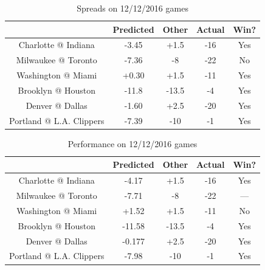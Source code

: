 \documentclass{article}
\begin{document}
\begin{table}
  \begin{center}
    \begin{tabular}{ | c | c | c | c | c | }
      \hline
                                & Predicted     & Other  & Actual & Win?  \\ \hline
      Charlotte @ Indiana       & -3.45         & +1.5   & -16    & Yes   \\ \hline
      Milwaukee @ Toronto       & -7.36         & -8     & -22    & No   \\ \hline
      Washington @ Miami        & +0.30         & +1.5   & -11    & Yes    \\ \hline
      Brooklyn @ Houston        & -11.8         & -13.5  & -4     & Yes   \\ \hline
      Denver @ Dallas           & -1.60         & +2.5   & -20    & Yes   \\ \hline
      Portland @ L.A. Clippers  & -7.39         & -10    & -1     & Yes   \\ \hline
    \end{tabular}
  \end{center}
  \caption{Spreads on 12/12/2016 games}
\end{table}

\begin{table}
  \begin{center}
    \begin{tabular}{ | c | c | c | c | c | }
      \hline
                                & Predicted     & Other  & Actual & Win?  \\ \hline
      Charlotte @ Indiana       & -4.17         & +1.5   & -16    & Yes   \\ \hline
      Milwaukee @ Toronto       & -7.71         & -8     & -22    & ---   \\ \hline
      Washington @ Miami        & +1.52         & +1.5   & -11    & No    \\ \hline
      Brooklyn @ Houston        & -11.58         & -13.5  & -4     & Yes   \\ \hline
      Denver @ Dallas           & -0.177         & +2.5   & -20    & Yes   \\ \hline
      Portland @ L.A. Clippers  & -7.98         & -10    & -1     & Yes   \\ \hline
    \end{tabular}
  \end{center}
  \caption{Performance on 12/12/2016 games}
\end{table}
\end{document}
